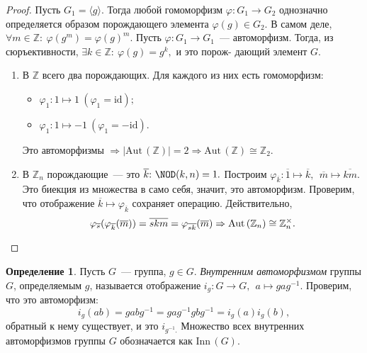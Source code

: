 \documentclass[a4paper, 14pt]{extarticle}
\newcommand{\integers}{\mathbb{Z}}
\newcommand{\id}{\mathrm{id}}
\newcommand{\Aut}{\mathrm{Aut} \,}
\newcommand{\Inn}{\mathrm{Inn} \,}
\renewcommand{\phi}{\varphi}
\theoremstyle{definition}
\newtheorem{definition}{Определение}
\theoremstyle{plain}
\numberwithin{theorem}{section}
\numberwithin{definition}{section}
\numberwithin{statement}{section}
\numberwithin{lemma}{section}
\numberwithin{consequence}{section}
\begin{document}
        \begin{proof}
            Пусть ${G_1 = \langle g \rangle.}$ Тогда любой гомоморфизм ${\phi : G_1 \rightarrow G_2}$ однозначно определяется образом порождающего элемента ${\phi(g) \in G_2.}$ В самом деле, ${\forall m \in \integers{:} \ \phi(g^m) = \phi(g)^m.}$ Пусть ${\phi : G_1 \rightarrow G_1}$~--- автоморфизм. Тогда, из сюръективности, ${\exists k \in \integers{:} \ \phi(g) = g^k,}$ и это порож- дающий элемент $G$.
            \begin{enumerate}
            \setlength\itemsep{0.1em}
                \item В $\integers$ всего два порождающих. Для каждого из них есть гомоморфизм:
                \begin{itemize}
                \setlength\itemsep{0.1em}
                    \item ${\phi_1 : 1 \mapsto 1 \ (\phi_1 = \id);}$
                    \item ${\phi_1 : 1 \mapsto -1 \ (\phi_1 = -\id).}$
                \end{itemize}
                Это автоморфизмы ${\Rightarrow |\Aut(\integers)| = 2 \Rightarrow \Aut(\integers) \cong \integers_2.}$
                \item В $\integers_n$ порождающие~--- это ${\overline{k}{:} \ \NOD(k,n) = 1.}$ \newline
                Построим ${\phi_{\overline{k}} : \overline{1} \mapsto \overline{k}, \ \ \overline{m} \mapsto \overline{km}.}$ Это биекция из множества в само себя, значит, это автоморфизм. Проверим, что отображение ${\overline{k} \mapsto \phi_{\overline{k}}}$ сохраняет операцию. Действительно,
                \begin{equation*}
                    \phi_{\overline{s}}(\phi_{\overline{k}}(\overline{m})) = \overline{skm} = \phi_{\overline{sk}}(\overline{m}) \Rightarrow \Aut(\integers_n) \cong \integers^\times_n. \qedhere
                \end{equation*}
            \end{enumerate}
          \end{proof}
          \newpage
          \begin{definition}
              Пусть $G$~--- группа, ${g \in G.}$ \textit{Внутренним автоморфизмом} группы $G$, определяемым $g$, называется отображение ${i_g : G \rightarrow G, \ \ a \mapsto gag^{-1}.}$\newline
              Проверим, что это автоморфизм:
              \begin{equation*}
                  i_g(ab) = gabg^{-1} = gag^{-1}gbg^{-1} = i_g(a)i_g(b),
              \end{equation*}
              обратный к нему существует, и это $i_{g^{-1}.}$\newline
              Множество всех внутренних автоморфизмов группы $G$ обозначается как $\Inn(G)$.
          \end{definition}
\end{document}
